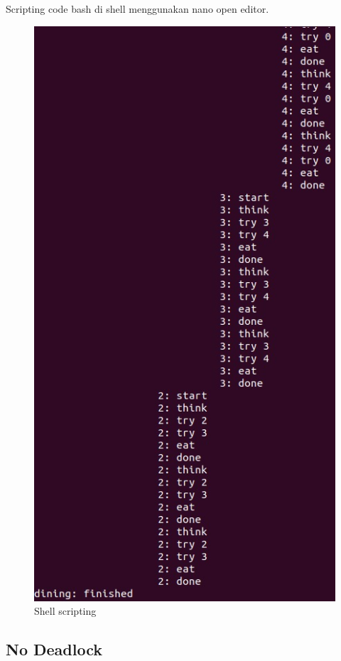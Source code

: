 \documentclass[11pt,a4paper]{article}
\begin{document}
    Scripting code bash di shell menggunakan nano open editor.
    \begin{figure}[h]
        \centering
        \includegraphics[scale = 0.2]{Figure/dining deadlock(2).png}
        \caption{Shell scripting}
        \label{fig:asg8_2}
    \end{figure}
\subsection{No Deadlock}
\end{document}
